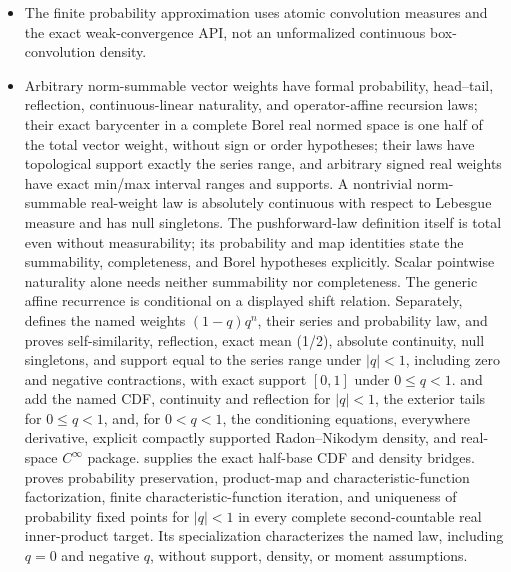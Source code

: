 \documentclass[11pt,oneside]{article}
\theoremstyle{definition}
\theoremstyle{remark}
\begin{document}
\begin{itemize}
\item The finite probability approximation uses atomic convolution measures and the exact
      weak-convergence API, not an unformalized continuous box-convolution density.
\item Arbitrary norm-summable vector weights have formal probability, head--tail,
      reflection, continuous-linear naturality, and operator-affine recursion laws;
      their exact barycenter in a complete Borel real normed space is one half of the
      total vector weight, without sign or order hypotheses;
      their laws have topological support exactly the series range, and arbitrary signed real
      weights have exact min/max interval ranges and supports.  A nontrivial norm-summable
      real-weight law is absolutely continuous with respect to Lebesgue measure and has null
      singletons.  The
      pushforward-law definition itself is total even without measurability; its
      probability and map identities state the summability, completeness, and Borel
      hypotheses explicitly.  Scalar pointwise naturality alone needs neither summability
      nor completeness.  The generic affine recurrence is conditional on a displayed
      shift relation.  Separately,  defines the named weights
      \((1-q)q^n\), their series and probability law, and proves self-similarity, reflection,
      exact mean (1/2), absolute continuity, null singletons, and support equal to the
      series range under \(|q|<1\), including zero and negative contractions, with exact
      support \([0,1]\) under \(0\le q<1\).
       and  add the named CDF,
      continuity and reflection for \(|q|<1\), the exterior tails for \(0\le q<1\), and,
      for \(0<q<1\), the conditioning equations, everywhere derivative, explicit
      compactly supported Radon--Nikodym density, and real-space \(C^\infty\) package.
       supplies the exact half-base CDF and density
      bridges.   proves probability preservation,
      product-map and characteristic-function factorization, finite characteristic-function
      iteration, and uniqueness of probability fixed points for \(|q|<1\) in every complete
      second-countable real inner-product target.  Its
       specialization characterizes the named law,
      including \(q=0\) and negative \(q\), without support, density, or moment assumptions.

\end{itemize}
\end{document}
